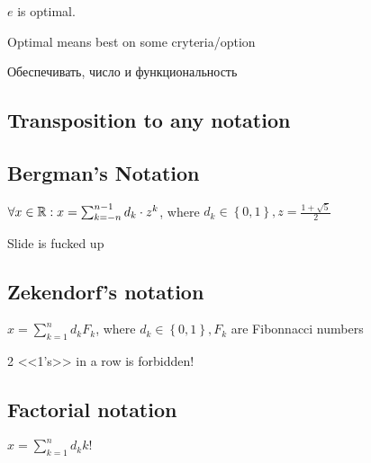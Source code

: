 $e$ is optimal.

Optimal means best on some cryteria/option

Обеспечивать, число и функциональность

\subsection{Transposition to any notation}

\subsection{Bergman's Notation}
$\forall x \in \mathbb{R}: x = \sum_{k = -n}^{n-1} d_k \cdot z^{k}$, where $d_{k} \in \left\{ 0, 1 \right \}, z = \frac{1 + \sqrt{5}}{2} $

Slide is fucked up

\subsection{Zekendorf's notation}

$x = \sum_{k = 1}^{n} d_{k}F_{k}$, where $d_{k} \in \left\{ 0, 1 \right \} , F_{k}$ are Fibonnacci numbers

2 <<1's>> in a row is forbidden!

\subsection{Factorial notation}

$x = \sum_{k = 1}^{n} d_{k} k!$
